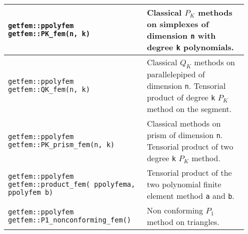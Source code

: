 \begin{center} \begin{tabular}{|m{0.55\linewidth}|m{0.4\linewidth}|} \hline
{\tt getfem::ppolyfem getfem::PK\_fem(n, k)} & Classical $P_K$ methods on simplexes of dimension  {\tt n} with degree {\tt k} polynomials.\\ \hline
{\tt getfem::ppolyfem getfem::QK\_fem(n, k)} & Classical $Q_K$ methods on parallelepiped of dimension {\tt n}. Tensorial product of degree {\tt k} $P_K$ method on the segment. \\ \hline
{\tt getfem::ppolyfem getfem::PK\_prism\_fem(n, k)} & Classical methods on prism of dimension {\tt n}. Tensorial product of two degree {\tt k} $P_K$ method. \\ \hline
{\tt getfem::ppolyfem getfem::product\_fem( ppolyfem\;a, ppolyfem b)} & Tensorial product of the two polynomial finite element method {\tt a} and {\tt b}. \\ \hline
{\tt getfem::ppolyfem $\;$ getfem::P1\_nonconforming\_fem()} & Non conforming $P_1$ method on triangles. \\ \hline
\end{tabular} \end{center}
